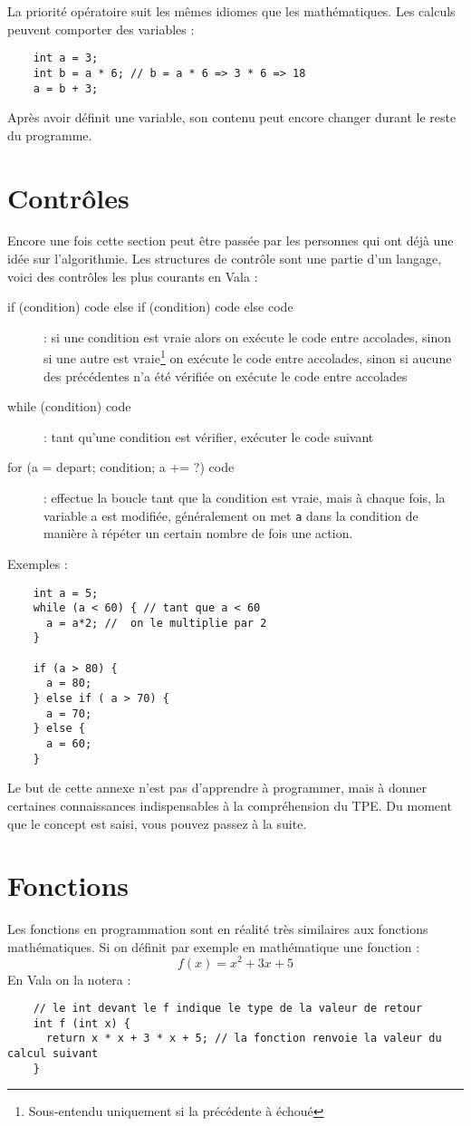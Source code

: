   La priorité opératoire suit les mêmes idiomes que les mathématiques. Les calculs peuvent comporter des variables : 
  \begin{lstlisting}
    int a = 3;
    int b = a * 6; // b = a * 6 => 3 * 6 => 18 
    a = b + 3;
  \end{lstlisting}
  
  Après avoir définit une variable, son contenu peut encore changer durant le reste du programme.
  
\section{Contrôles}
  Encore une fois cette section peut être passée par les personnes qui ont déjà une idée sur l'algorithmie.
  Les structures de contrôle sont une partie d'un langage, voici des contrôles les plus courants en Vala :
  \begin{description}
    \item[ if (condition) { code } else if (condition) { code } else { code } ] : si une condition est vraie alors on exécute le code entre accolades, sinon si une autre est vraie\footnote{Sous-entendu uniquement si la précédente à échoué} on exécute le code entre accolades, sinon si aucune des précédentes n'a été vérifiée on exécute le code entre accolades
    \item[while (condition) { code }] : tant qu'une condition est vérifier, exécuter le code suivant
    \item[for (a = depart; condition; a += ?) { code }] : effectue la boucle tant que la condition est vraie, mais à chaque fois, la variable a est modifiée, généralement on met \texttt{a} dans la condition de manière à répéter un certain nombre de fois une action.
  \end{description}
  
  Exemples :
  \begin{lstlisting}
    int a = 5;
    while (a < 60) { // tant que a < 60
      a = a*2; //  on le multiplie par 2
    }
    
    if (a > 80) {
      a = 80;
    } else if ( a > 70) {
      a = 70;
    } else {
      a = 60;
    }
  \end{lstlisting}
  
  Le but de cette annexe n'est pas d'apprendre à programmer, mais à donner certaines connaissances indispensables à la compréhension du TPE. Du moment que le concept est saisi, vous pouvez passez à la suite.

\section{Fonctions}
  Les fonctions en programmation sont en réalité très similaires aux fonctions mathématiques. Si on définit par exemple en mathématique une fonction : 
  \[ f(x) = x^2 + 3x + 5 \]
  En Vala on la notera :
  \begin{lstlisting}
    // le int devant le f indique le type de la valeur de retour
    int f (int x) {
      return x * x + 3 * x + 5; // la fonction renvoie la valeur du calcul suivant
    }
  \end{lstlisting}
  
